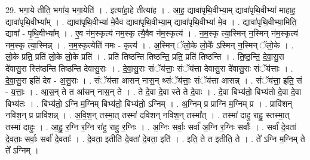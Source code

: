 \documentclass[17pt]{extarticle}
\begin{document}
29. भगा॒ये तीति॒ भगा॑य॒ भगा॒येति॑ । . इत्या॑हा॒हे तीत्या॑ह । . आ॒ह॒ द्यावा॑पृथि॒वीभ्या॒म् द्यावा॑पृथि॒वीभ्या॑ माहाह॒ द्यावा॑पृथि॒वीभ्या᳚म् । . द्यावा॑पृथि॒वीभ्या॑ मे॒वैव द्यावा॑पृथि॒वीभ्या॒म् द्यावा॑पृथि॒वीभ्या॑ मे॒व । . द्यावा॑पृथि॒वीभ्या॒मिति॒ द्यावा᳚ - पृ॒थि॒वीभ्या᳚म् । . ए॒व न॑म॒स्कृत्य॑ नम॒स्कृ त्यै॒वैव न॑म॒स्कृत्य॑ । . न॒म॒स्कृ त्या॒स्मिन् न॒स्मिन् न॑म॒स्कृत्य॑ नम॒स्कृ त्या॒स्मिन्न् । . न॒म॒स्कृत्येति॑ नमः - कृत्य॑ । . अ॒स्मिन् ॅलो॒के लो॒के᳚ ऽस्मिन् न॒स्मिन् ॅलो॒के । . लो॒के प्रति॒ प्रति॑ लो॒के लो॒के प्रति॑ । . प्रति॑ तिष्ठन्ति तिष्ठन्ति॒ प्रति॒ प्रति॑ तिष्ठन्ति । . ति॒ष्ठ॒न्ति॒ दे॒वा॒सु॒रा दे॑वासु॒रा स्ति॑ष्ठन्ति तिष्ठन्ति देवासु॒राः । . दे॒वा॒सु॒राः संॅय॑त्ताः॒ संॅय॑त्ता देवासु॒रा दे॑वासु॒राः संॅय॑त्ताः । . दे॒वा॒सु॒रा इति॑ देव - अ॒सु॒राः । . संॅय॑त्ता आसन् नास॒न् थ्संॅय॑त्ताः॒ संॅय॑त्ता आसन्न् । . संॅय॑त्ता॒ इति॒ सं - य॒त्ताः॒ । . आ॒स॒न् ते त आ॑सन् नास॒न् ते । . ते दे॒वा दे॒वा स्ते ते दे॒वाः । . दे॒वा बिभ्य॑तो॒ बिभ्य॑तो दे॒वा दे॒वा बिभ्य॑तः । . बिभ्य॑तो॒ ऽग्नि म॒ग्निम् बिभ्य॑तो॒ बिभ्य॑तो॒ ऽग्निम् । . अ॒ग्निम् प्र प्राग्नि म॒ग्निम् प्र । . प्रावि॑शन् नविश॒न् प्र प्रावि॑शन्न् । . अ॒वि॒श॒न् तस्मा॒त् तस्मा॑ दविशन् नविश॒न् तस्मा᳚त् । . तस्मा॑ दाहु राहु॒ स्तस्मा॒त् तस्मा॑ दाहुः । . आ॒हु॒ र॒ग्नि र॒ग्नि रा॑हु राहु र॒ग्निः । . अ॒ग्निः सर्वाः॒ सर्वा॑ अ॒ग्नि र॒ग्निः सर्वाः᳚ । . सर्वा॑ दे॒वता॑ दे॒वताः॒ सर्वाः॒ सर्वा॑ दे॒वताः᳚ । . दे॒वता॒ इतीति॑ दे॒वता॑ दे॒वता॒ इति॑ । . इति॒ ते त इतीति॒ ते । . ते᳚ ऽग्नि म॒ग्निम् ते ते᳚ ऽग्निम् । \newline
\end{document}
